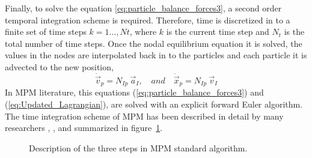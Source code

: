 Finally, to solve the equation \eqref{eq:particle_balance_forces3}, a second order
temporal integration scheme is required. Therefore, time is
discretized in to a finite set of time steps $k = 1\ldots ,Nt$, where $k$ is the current time step and $N_t$
is the total number of time steps. Once the nodal equilibrium equation it is solved, the values in the nodes are
interpolated back in to the particles and each particle it is advected
to the new position,
\begin{equation}
  \label{eq:Updated_Lagrangian}
  \dot{\vec{v}}_p = N_{Ip}\ \vec{a}_{I},\quad and\quad
  \dot{\vec{x}}_{p} = N_{Ip}\ \vec{v}_{I}  
\end{equation}
In MPM literature, this equations
(\ref{eq:particle_balance_forces3}) and (\ref{eq:Updated_Lagrangian}),
are solved with an explicit forward Euler algorithm. The time integration scheme of MPM has been described in detail by many researchers
\cite{Sulsky1994}, \cite{Bardenhagen2002}, \cite{thesis_Andersen_2009} and summarized
in figure~\ref{fig:MPM_algorithm}.
\begin{figure}\sidecaption
  \centering
  \caption{Description of the three steps in MPM standard algorithm.}
  \label{fig:MPM_algorithm}
\end{figure}
